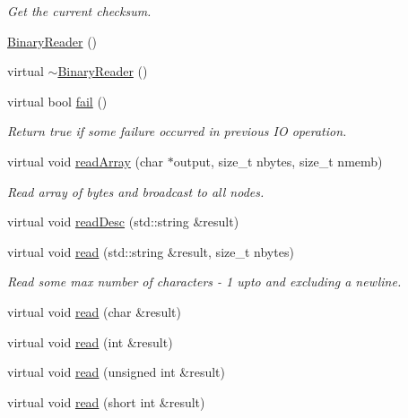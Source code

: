 \begin{DoxyCompactItemize}
\begin{DoxyCompactList}\small\item\em Get the current checksum. \end{DoxyCompactList}\item 
\mbox{\hyperlink{classADATIO_1_1BinaryReader_a19220cacd1c2fce407b2606d202ff1c5}{Binary\+Reader}} ()
\item 
virtual \mbox{\hyperlink{classADATIO_1_1BinaryReader_a0410bcb7a122066b009e538ed5d47c5c}{$\sim$\+Binary\+Reader}} ()
\item 
virtual bool \mbox{\hyperlink{classADATIO_1_1BinaryReader_a4db0ebc0b7edd371bf0daa98e3bc696b}{fail}} ()
\begin{DoxyCompactList}\small\item\em Return true if some failure occurred in previous IO operation. \end{DoxyCompactList}\item 
virtual void \mbox{\hyperlink{classADATIO_1_1BinaryReader_aba9bb1d3a6af4b6ab28388f6bd003d91}{read\+Array}} (char $\ast$output, size\+\_\+t nbytes, size\+\_\+t nmemb)
\begin{DoxyCompactList}\small\item\em Read array of bytes and broadcast to all nodes. \end{DoxyCompactList}\item 
virtual void \mbox{\hyperlink{classADATIO_1_1BinaryReader_a70de2f31f59d9846f4ee688c3590bf31}{read\+Desc}} (std\+::string \&result)
\item 
virtual void \mbox{\hyperlink{classADATIO_1_1BinaryReader_a4d79cabea18fccc818eaf2c45ed21b1f}{read}} (std\+::string \&result, size\+\_\+t nbytes)
\begin{DoxyCompactList}\small\item\em Read some max number of characters -\/ 1 upto and excluding a newline. \end{DoxyCompactList}\item 
virtual void \mbox{\hyperlink{classADATIO_1_1BinaryReader_a04c653824b3819b4b02ea5eed6fd57f5}{read}} (char \&result)
\item 
virtual void \mbox{\hyperlink{classADATIO_1_1BinaryReader_a865909a3033e753939e5d634a8fbff05}{read}} (int \&result)
\item 
virtual void \mbox{\hyperlink{classADATIO_1_1BinaryReader_ac8fdf69d46dd08e49c676202927247a4}{read}} (unsigned int \&result)
\item 
virtual void \mbox{\hyperlink{classADATIO_1_1BinaryReader_acd797e0f037099dc050f4444b13179be}{read}} (short int \&result)

\end{DoxyCompactItemize}
